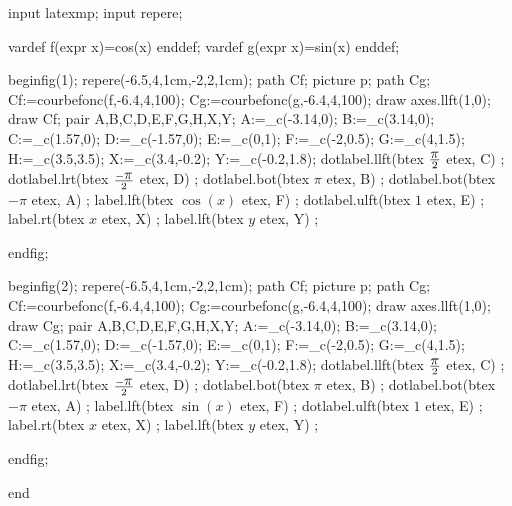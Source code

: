 input latexmp;
input repere;

vardef f(expr x)=cos(x) enddef;
vardef g(expr x)=sin(x) enddef;

beginfig(1);
repere(-6.5,4,1cm,-2,2,1cm);
 path Cf; picture p; path Cg;
 Cf:=courbefonc(f,-6.4,4,100);
 Cg:=courbefonc(g,-6.4,4,100);
 draw axes.llft(1,0);
 draw Cf;
 pair A,B,C,D,E,F,G,H,X,Y;
 A:=_c(-3.14,0);
 B:=_c(3.14,0);
 C:=_c(1.57,0);
 D:=_c(-1.57,0);
 E:=_c(0,1);
 F:=_c(-2,0.5);
 G:=_c(4,1.5);
 H:=_c(3.5,3.5);
 X:=_c(3.4,-0.2);
 Y:=_c(-0.2,1.8);
 dotlabel.llft(btex $ \displaystyle \pi \over 2 $ etex, C) ;
  dotlabel.lrt(btex $- \displaystyle \pi \over 2 $ etex, D) ;
 dotlabel.bot(btex $ \pi $ etex, B) ;
 dotlabel.bot(btex $ -\pi $ etex, A) ;
 label.lft(btex $ \cos(x) $ etex, F) ;
  dotlabel.ulft(btex $1$ etex, E) ;
    label.rt(btex $x$ etex, X) ;
    label.lft(btex $y$ etex, Y) ;


 endfig;

beginfig(2);
repere(-6.5,4,1cm,-2,2,1cm);
 path Cf; picture p; path Cg;
 Cf:=courbefonc(f,-6.4,4,100);
 Cg:=courbefonc(g,-6.4,4,100);
 draw axes.llft(1,0);
 draw Cg;
 pair A,B,C,D,E,F,G,H,X,Y;
 A:=_c(-3.14,0);
 B:=_c(3.14,0);
 C:=_c(1.57,0);
 D:=_c(-1.57,0);
 E:=_c(0,1);
 F:=_c(-2,0.5);
 G:=_c(4,1.5);
 H:=_c(3.5,3.5);
 X:=_c(3.4,-0.2);
 Y:=_c(-0.2,1.8);
 dotlabel.llft(btex $ \displaystyle \pi \over 2 $ etex, C) ;
  dotlabel.lrt(btex $- \displaystyle  \pi \over 2 $ etex, D) ;
 dotlabel.bot(btex $ \pi $ etex, B) ;
 dotlabel.bot(btex $ -\pi $ etex, A) ;
 label.lft(btex $ \sin(x) $ etex, F) ;
 dotlabel.ulft(btex $1$ etex, E) ;
    label.rt(btex $x$ etex, X) ;
    label.lft(btex $y$ etex, Y) ;


 endfig;



end
